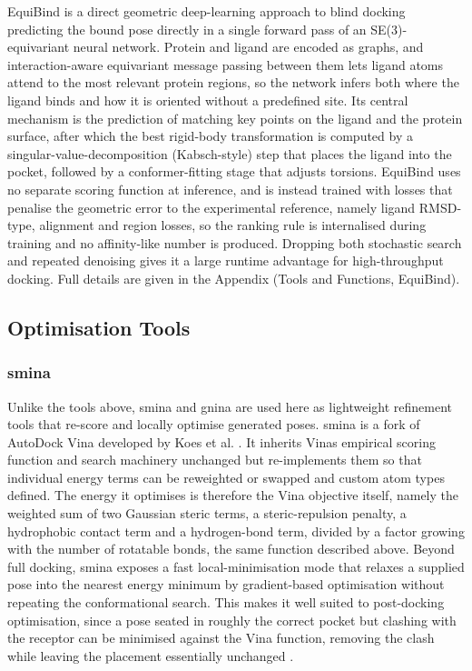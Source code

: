 EquiBind is a direct geometric deep-learning approach to blind docking predicting the bound pose directly in a single forward pass of an SE(3)-equivariant neural network. Protein and ligand are encoded as graphs, and interaction-aware equivariant message passing between them lets ligand atoms attend to the most relevant protein regions, so the network infers both where the ligand binds and how it is oriented without a predefined site. Its central mechanism is the prediction of matching key points on the ligand and the protein surface, after which the best rigid-body transformation is computed by a singular-value-decomposition (Kabsch-style) step that places the ligand into the pocket, followed by a conformer-fitting stage that adjusts torsions. EquiBind uses no separate scoring function at inference, and is instead trained with losses that penalise the geometric error to the experimental reference, namely ligand RMSD-type, alignment and region losses, so the ranking rule is internalised during training and no affinity-like number is produced. Dropping both stochastic search and repeated denoising gives it a large runtime advantage for high-throughput docking. Full details are given in the Appendix (Tools and Functions, EquiBind).

\hypertarget{optimization-tools}{%
\subsection{Optimisation Tools}\label{optimization-tools}}

\hypertarget{smina}{%
\subsubsection{smina}\label{smina}}

Unlike the tools above, smina and gnina are used here as lightweight refinement tools that re-score and locally optimise generated poses. smina is a fork of AutoDock Vina developed by Koes et al. \cite{ref055}. It inherits Vina\textquotesingle s empirical scoring function and search machinery unchanged but re-implements them so that individual energy terms can be reweighted or swapped and custom atom types defined. The energy it optimises is therefore the Vina objective itself, namely the weighted sum of two Gaussian steric terms, a steric-repulsion penalty, a hydrophobic contact term and a hydrogen-bond term, divided by a factor growing with the number of rotatable bonds, the same function described above. Beyond full docking, smina exposes a fast local-minimisation mode that relaxes a supplied pose into the nearest energy minimum by gradient-based optimisation without repeating the conformational search. This makes it well suited to post-docking optimisation, since a pose seated in roughly the correct pocket but clashing with the receptor can be minimised against the Vina function, removing the clash while leaving the placement essentially unchanged \cite{ref057}.

